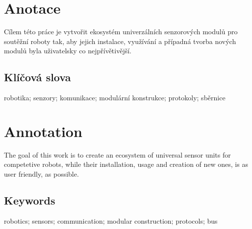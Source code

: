 \documentclass{template/socthesis}
\author{Tomáš Rohlínek}
\begin{document}
	\maketitle
	
	
	
	\pagestyle{empty}
	
	\section*{Anotace}
	Cílem této práce je vytvořit ekosystém univerzálních senzorových modulů pro soutěžní roboty tak, aby jejich instalace, využívání a případná tvorba nových modulů byla uživatelsky co nejpřívětivější.
	
	\subsection*{Klíčová slova}
	robotika; senzory; komunikace; modulární konstrukce; protokoly; sběrnice
	
	\vspace{20mm}
	
	\section*{Annotation}
	The goal of this work is to create an ecosystem of universal sensor units for competetive robots, while their installation, usage and creation of new ones, is as user friendly, as possible. 
	
	\subsection*{Keywords}
	robotics; sensors; communication; modular construction; protocols; bus
	
	\newpage
	\pagestyle{plain}
	
	\tableofcontents %
	
	\setcounter{figure}{0}
	\setcounter{table}{0}
	\newpage
	
	
	
	
	
	
	
\end{document}
